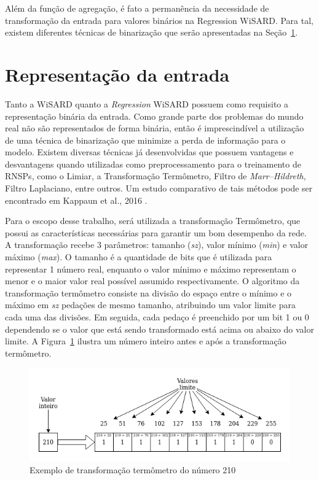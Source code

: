     Além da função de agregação, é fato a permanência da necessidade de transformação da entrada para valores binários na Regression WiSARD. Para tal, existem diferentes técnicas de binarização que serão apresentadas na Seção~\ref{sec:input_repr}.

\section{Representação da entrada} \label{sec:input_repr}
    Tanto a WiSARD quanto a \textit{Regression} WiSARD possuem como requisito a representação binária da entrada. Como grande parte dos problemas do mundo real não são representados de forma binária, então é imprescindível a utilização de uma técnica de binarização que minimize a perda de informação para o modelo. Existem diversas técnicas já desenvolvidas que possuem vantagens e desvantagens quando utilizadas como preprocessamento para o treinamento de RNSPs, como o Limiar, a Transformação Termômetro, Filtro de \textit{Marr–Hildreth}, Filtro Laplaciano, entre outros. Um estudo comparativo de tais métodos pode ser encontrado em Kappaun et al., 2016 \cite{binenctec}.
    
    Para o escopo desse trabalho, será utilizada a transformação Termômetro, que possui as características necessárias para garantir um bom desempenho da rede. A transformação recebe 3 parâmetros: tamanho (\textit{sz}), valor mínimo (\textit{min}) e valor máximo (\textit{max}). O tamanho é a quantidade de bits que é utilizada para representar 1 número real, enquanto o valor mínimo e máximo representam o menor e o maior valor real possível assumido respectivamente. O algoritmo da transformação termômetro consiste na divisão do espaço entre o mínimo e o máximo em \textit{sz} pedações de mesmo tamanho, atribuindo um valor limite para cada uma das divisões. Em seguida, cada pedaço é preenchido por um bit 1 ou 0 dependendo se o valor que está sendo transformado está acima ou abaixo do valor limite. A Figura~\ref{fig:therm_ex} ilustra um número inteiro antes e após a transformação termômetro.
    
    \begin{figure}[!ht] \label{fig:therm_ex}
    \centering
    \includegraphics[width=5.0in]{img/therm_example.png}
    \caption{Exemplo de transformação termômetro do número 210}
    \end{figure}

